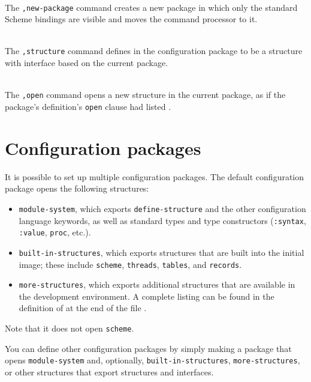 \begin{description}
\item {} \\
    The {\tt,new-package} command creates a new package in which only
    the standard Scheme bindings are visible and moves the command
    processor to it.

\item {} \\
    The {\tt ,structure} command defines  in the
    configuration package to be a structure with interface
     based on the current package.

\item {} \\
    The {\tt,open} command opens a new structure in the current
    package, as if the package's definition's {\tt open} clause
    had listed .

\end{description}



\section{Configuration packages}
\label{config-packages}

It is possible to set up multiple configuration packages.  The default
configuration package opens the following structures:
\begin{itemize}
\item {\tt module-system}, which exports {\tt define-structure} and the
      other configuration language keywords, as well as standard types
      and type constructors ({\tt :syntax}, {\tt :value}, {\tt proc}, etc.).
\item {\tt built-in-structures}, which exports structures that are
      built into the initial \hack{} image; these include
      {\tt scheme}, {\tt threads}, {\tt tables}, and {\tt records}.
\item {\tt more-structures}, which exports additional structures that
      are available in the development environment. 
      A complete listing
      can be found in the definition of 
      at the end of the file .
\end{itemize}
Note that it does not open {\tt scheme}.

You can define other configuration packages by simply making a package
 that opens {\tt module-system} and, optionally, {\tt built-in-\ok{}structures},
{\tt more-\ok{}structures}, or other structures that
 export structures and interfaces.

